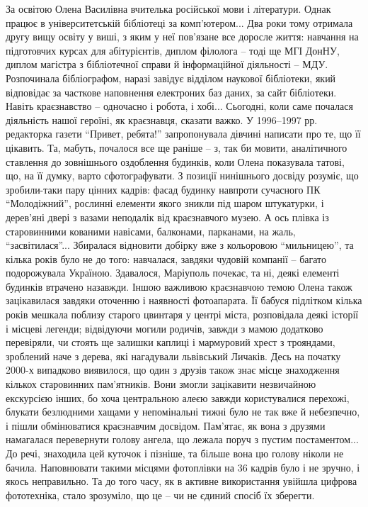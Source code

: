 За освітою Олена Василівна вчителька російської мови і літератури. Однак працює
в університетській бібліотеці за комп'ютером... Два роки тому отримала другу вищу
освіту у виші, з яким у неї пов'язане все доросле життя: навчання на
підготовчих курсах для абітурієнтів, диплом філолога – тоді ще МГІ ДонНУ,
диплом магістра з бібліотечної справи й інформаційної діяльності – МДУ.
Розпочинала бібліографом, наразі завідує відділом наукової бібліотеки, який
відповідає за часткове наповнення електроних баз даних, за сайт бібліотеки.
Навіть краєзнавство – одночасно і робота, і хобі... Сьогодні, коли саме почалася
діяльність нашої героїні, як краєзнавця, сказати важко. У 1996–1997 рр.
редакторка газети \enquote{Привет, ребята!} запропонувала дівчині написати про те, що
її цікавить. Та, мабуть, почалося все ще раніше – з, так би мовити,
аналітичного ставлення до зовнішнього оздоблення будинків, коли Олена
показувала татові, що, на її думку, варто сфотографувати. З позиції нинішнього
досвіду розуміє, що зробили-таки пару цінних кадрів: фасад будинку навпроти
сучасного ПК \enquote{Молодіжний}, рослинні елементи якого зникли під шаром штукатурки,
і дерев'яні двері з вазами неподалік від краєзнавчого музею. А ось плівка із
старовинними кованими навісами, балконами, парканами, на жаль, \enquote{засвітилася}...
Збиралася відновити добірку вже з кольоровою \enquote{мильницею}, та кілька років було
не до того: навчалася, завдяки чудовій компанії – багато подорожувала Україною.
Здавалося, Маріуполь почекає, та ні, деякі елементі будинків втрачено назавжди.
Іншою важливою  краєзнавчою темою Олена також зацікавилася завдяки оточенню і
наявності фотоапарата. Її бабуся підлітком кілька років мешкала поблизу старого
цвинтаря у центрі міста, розповідала деякі історії і місцеві легенди;
відвідуючи могили родичів, завжди з мамою додатково перевіряли, чи стоять ще
залишки каплиці і мармуровий хрест з трояндами, зроблений наче з дерева, які
нагадували львівський Личаків. Десь на початку 2000-х випадково виявилося, що
один з друзів також знає місце знаходження кількох старовинних пам'ятників.
Вони змогли зацікавити незвичайною екскурсією інших, бо хоча центральною алеєю
завжди користувалися перехожі, блукати безлюдними хащами у непомінальні тижні
було не так вже й небезпечно, і пішли обмінюватися краєзнавчим досвідом.
Пам'ятає, як вона з друзями намагалася перевернути голову ангела, що лежала
поруч з пустим постаментом... До речі, знаходила цей куточок і пізніше, та більше
вона цю голову ніколи не бачила. Наповнювати такими місцями фотоплівки на 36
кадрів було і не зручно, і якось неправильно. Та до того часу, як в активне
використання увійшла цифрова фототехніка, стало зрозуміло, що це – чи не єдиний
спосіб їх зберегти. 

